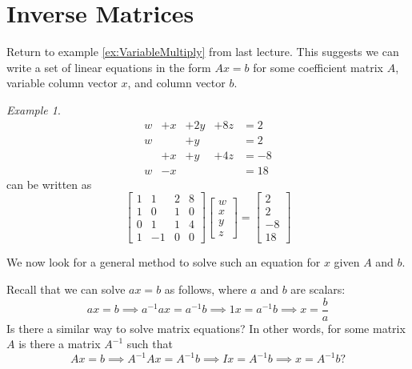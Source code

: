 \documentclass[10pt, a4paper]{amsart}
\theoremstyle{definition}
\theoremstyle{remark}
\newtheorem{ex}{Example}
\begin{document}
\section{Inverse Matrices}
Return to example \ref{ex:VariableMultiply} from last lecture. This suggests we can write a set of linear
equations in the form $ Ax = b $ for some coefficient matrix $ A $, variable column vector $ x $, and column vector $ b $.

\begin{ex}
\begin{displaymath}\begin{array}{rllll}
  w & + x & + 2y & + 8z & = 2\\
  w &     & + y  &      & = 2\\
    & + x & + y  & + 4z & = -8\\
  w & - x &      &      & = 18
\end{array}\end{displaymath}
can be written as
\begin{displaymath}
  \begin{bmatrix} 1 & 1 & 2 & 8 \\ 1 & 0 & 1 & 0 \\ 0 & 1 & 1 & 4 \\ 1 & -1 & 0 & 0 \end{bmatrix}
  \begin{bmatrix} w \\ x \\ y \\ z \end{bmatrix}
  =
  \begin{bmatrix} 2 \\ 2 \\ -8 \\ 18 \end{bmatrix}
\end{displaymath}
\end{ex}

We now look for a general method to solve such an equation for $ x $ given $ A $ and $ b $.

Recall that we can solve $ ax = b $ as follows, where $ a $ and $ b $ are scalars:
\begin{displaymath}
  ax = b \implies a^{-1}ax = a^{-1} b \implies 1x = a^{-1} b \implies x = \frac{b}{a}
\end{displaymath}
Is there a similar way to solve matrix equations? In other words, for some matrix $ A $
is there a matrix $ A^{-1} $ such that
\begin{displaymath}
  Ax = b \implies A^{-1} Ax = A^{-1} b \implies Ix = A^{-1} b \implies x = A^{-1} b?
\end{displaymath}
\end{document}

